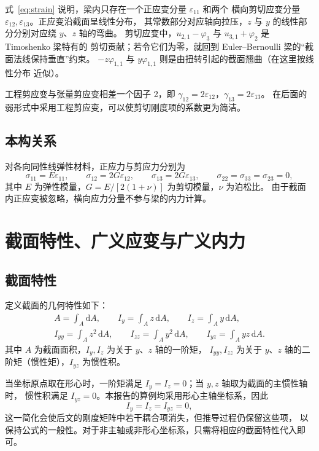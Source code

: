 \documentclass[UTF8,a4paper,11pt]{ctexart}
\newcommand{\ud}{\mathrm{d}}
\begin{document}
式~\eqref{eq:strain} 说明，梁内只存在一个正应变分量 $\varepsilon_{11}$ 和两个
横向剪切应变分量 $\varepsilon_{12},\varepsilon_{13}$。正应变沿截面呈线性分布，
其常数部分对应轴向拉压，$z$ 与 $y$ 的线性部分分别对应绕 $y$、$z$ 轴的弯曲。
剪切应变中，$u_{2,1}-\varphi_3$ 与 $u_{3,1}+\varphi_2$ 是 Timoshenko 梁特有的
剪切贡献；若令它们为零，就回到 Euler--Bernoulli 梁的“截面法线保持垂直”约束。
$-z\varphi_{1,1}$ 与 $y\varphi_{1,1}$ 则是由扭转引起的截面翘曲（在这里按线性分布
近似）。

工程剪应变与张量剪应变相差一个因子 2，即
$\gamma_{12}=2\varepsilon_{12}$，$\gamma_{13}=2\varepsilon_{13}$。
在后面的弱形式中采用工程剪应变，可以使剪切刚度项的系数更为简洁。

\subsection{本构关系}

对各向同性线弹性材料，正应力与剪应力分别为
\begin{equation}\label{eq:hooke}
\sigma_{11}=E\varepsilon_{11},\qquad
\sigma_{12}=2G\varepsilon_{12},\qquad
\sigma_{13}=2G\varepsilon_{13},\qquad
\sigma_{22}=\sigma_{33}=\sigma_{23}=0,
\end{equation}
其中 $E$ 为弹性模量，$G=E/[2(1+\nu)]$ 为剪切模量，$\nu$ 为泊松比。
由于截面内正应变被忽略，横向应力分量不参与梁的内力计算。

\section{截面特性、广义应变与广义内力}

\subsection{截面特性}

定义截面的几何特性如下：
\begin{equation}\label{eq:section}
\begin{gathered}
A=\int_A \ud A,\qquad
I_y=\int_A z\,\ud A,\qquad
I_z=\int_A y\,\ud A,\\
I_{yy}=\int_A z^2\,\ud A,\qquad
I_{zz}=\int_A y^2\,\ud A,\qquad
I_{yz}=\int_A yz\,\ud A.
\end{gathered}
\end{equation}
其中 $A$ 为截面面积，$I_y,I_z$ 为关于 $y$、$z$ 轴的一阶矩，
$I_{yy},I_{zz}$ 为关于 $y$、$z$ 轴的二阶矩（惯性矩），$I_{yz}$ 为惯性积。

当坐标原点取在形心时，一阶矩满足 $I_y=I_z=0$；当 $y,z$ 轴取为截面的主惯性轴时，
惯性积满足 $I_{yz}=0$。本报告的算例均采用形心主轴坐标系，因此
\begin{equation}\label{eq:principal}
I_y=I_z=I_{yz}=0,
\end{equation}
这一简化会使后文的刚度矩阵中若干耦合项消失，但推导过程仍保留这些项，
以保持公式的一般性。对于非主轴或非形心坐标系，只需将相应的截面特性代入即可。
\end{document}
